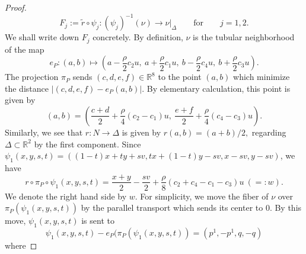 \documentclass[reqno]{amsart}
\theoremstyle{definition}
\theoremstyle{plain}
\newcommand{\RR}{\mathbb{R}}
\begin{document}
\begin{proof}
\[
F_j:=\tilde r\circ \psi_j:(\psi_j)^{-1}(\nu)\to \nu|_{\Delta}\qquad \text{for}\qquad j=1,2.
\]
We shall write down $F_j$ concretely. By definition, $\nu$ is the tubular neighborhood of the map
\[
e_P:(a,b)\mapsto \left(a-\frac{\rho}{2}c_2u,\ a+\frac{\rho}{2}c_1u,\ b-\frac{\rho}{2}c_4u,\ b+\frac{\rho}{2}c_3u\right).
\]
The projection $\pi_P$  sends $(c,d,e,f)\in \RR^8$ to the point $(a,b)$ which minimize the distance $|(c,d,e,f)-e_P(a,b)|$. By elementary calculation, this point is given by
\[
(a,b)=\left(\frac{c+d}{2}+\frac{\rho}{4}(c_2-c_1)u,\ \frac{e+f}{2}+\frac{\rho}{4}(c_4-c_3)u\right).
\]
Similarly, we see that $r:N\to \Delta$ is given by $r(a,b)=(a+b)/2,$ regarding $\Delta\subset \RR^2$ by the first component. 
 Since $\psi_1(x,y,s,t)=((1-t)x+ty+sv, tx+(1-t)y-sv, x-sv, y-sv)$, we have 
\[
r\circ \pi_P\circ \psi_1(x,y,s,t)=\frac{x+y}{2}-\frac{sv}{2}+\frac{\rho}{8}(c_2+c_4-c_1-c_3)u\ (=:w).
\] 
We denote the right hand side by $w$. For simplicity, we move the fiber of $\nu$ over $\pi_P(\psi_1(x,y,s,t))$ by the parallel transport which sends its center to $0$. By this move, $\psi_1(x,y,s,t)$ is sent to 
\[
\psi_1(x,y,s,t)-e_P(\pi_P(\psi_1(x,y,s,t))=(p^1,-p^1,q, -q)
\] 
where 


\end{proof}
\end{document}
